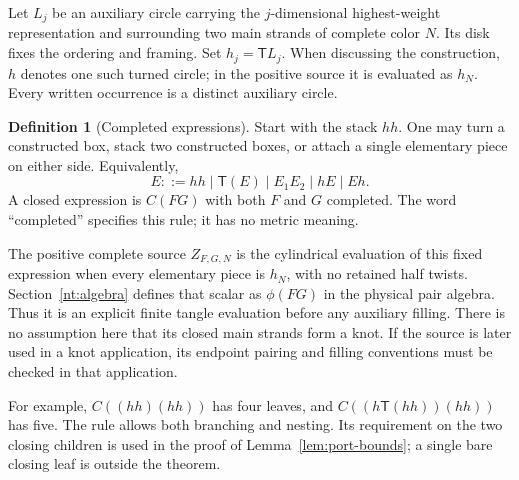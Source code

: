 \documentclass[11pt]{article}
\numberwithin{equation}{section}
\theoremstyle{definition}\newtheorem{definition}[theorem]{Definition}
\theoremstyle{remark}\newtheorem{remark}[theorem]{Remark}
\newcommand{\Turn}{\mathsf T}\newcommand{\Cheb}{\mathsf C}
\begin{document}
Let $L_j$ be an auxiliary circle carrying the $j$-dimensional
highest-weight representation and surrounding two main strands of
complete color $N$. Its disk fixes the ordering and framing. Set
$h_j=\Turn L_j$. When discussing the construction, $h$ denotes one
such turned circle; in the positive source it is evaluated as $h_N$.
Every written occurrence is a distinct auxiliary circle.

\begin{definition}[Completed expressions]\label{def:grammar}
Start with the stack $hh$. One may turn a constructed box, stack two
constructed boxes, or attach a single elementary piece on either side.
Equivalently,
\[
 E::=hh\mid\Turn(E)\mid E_1E_2\mid hE\mid Eh.
\]
A closed expression is $C(FG)$ with both $F$ and $G$ completed.
The word ``completed'' specifies this rule; it has no metric meaning.
\end{definition}

The positive complete source $Z_{F,G,N}$ is the cylindrical evaluation
of this fixed expression when every elementary piece is $h_N$, with
no retained half twists. Section~\ref{nt:algebra} defines that scalar
as $\phi(FG)$ in the physical pair algebra. Thus it is an explicit
finite tangle evaluation before any auxiliary filling. There is no
assumption here that its closed main strands form a knot. If the source
is later used in a knot application, its endpoint pairing and filling
conventions must be checked in that application.

For example, $C((hh)(hh))$ has four leaves, and
$C((h\Turn(hh))(hh))$ has five. The rule allows both branching and
nesting. Its requirement on the two closing children is used in the
proof of Lemma~\ref{lem:port-bounds}; a single bare closing leaf is
outside the theorem.
\end{document}
